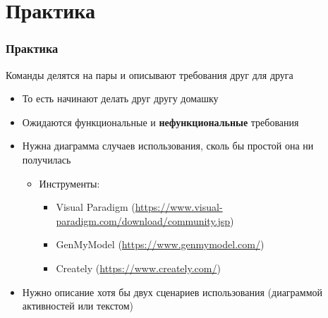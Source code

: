 \documentclass[xetex,mathserif,serif]{beamer}
\begin{document}
	\section{Практика}

	\begin{frame}
		\frametitle{Практика}
		Команды делятся на пары и описывают требования друг для друга
		\begin{itemize}
			\item То есть начинают делать друг другу домашку
			\item Ожидаются функциональные и \textbf{нефункциональные} требования
			\item Нужна диаграмма случаев использования, сколь бы простой она ни получилась
			\begin{itemize}
				\item Инструменты:
				\begin{itemize}
					\item Visual Paradigm (\url{https://www.visual-paradigm.com/download/community.jsp})
					\item GenMyModel (\url{https://www.genmymodel.com/})
					\item Creately (\url{https://www.creately.com/})
				\end{itemize}
			\end{itemize}
			\item Нужно описание хотя бы двух сценариев использования (диаграммой активностей или текстом)
		\end{itemize}
	\end{frame}
\end{document}
